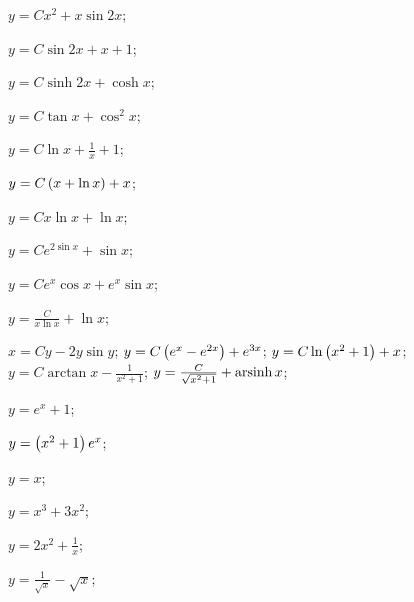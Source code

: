 \begin{enumsols}
		\item \( y = Cx^2 + x \sin{2x} \); \sfill %
		\item \( y = C \sin{2x} + x + 1 \); \sfill %
		\item \( y = C \sinh{2x} + \cosh{x} \); \sfill %
		\item \( y = C \tan{x} + \cos^2{x} \); \sfill %
		\item \( y = C \ln{x} + \frac{1}{x} + 1 \); \sfill %
		\item \( y = C \left( x + \ln{x} \right) + x \); \sfill %
		\item \( y = Cx \ln{x} + \ln{x} \); \sfill %
		\item \( y = Ce^{2 \sin{x}} + \sin{x} \); \sfill %
		\item \( y = Ce^{x} \cos{x} + e^{x} \sin{x} \); \sfill %
		\item \( y = \frac{C}{x \ln{x}} + \ln{x} \); \sfill %
		\item \( x = Cy - 2y \sin{y} \); \sfill %
		\itemstar \( y = C \left( e^{x} - e^{2x} \right) + e^{3x} \); \sfill %
		\itemstar \( y = C \ln\left( x^2 + 1 \right) + x \); \sfill %
		\itemstar \( y = C \arctan{x} - \frac{1}{x^2 + 1} \); \sfill %
		\itemstar \( y = \frac{C}{\sqrt{x^2 + 1}} + \operatorname{arsinh}{x} \); \sfill %

		\label{sol:firstorder:linear_cauchy}

		\item \( y = e^{x} + 1 \); \sfill %
		\item \( y = \left( x^2 + 1 \right) e^{x} \); \sfill %
		\item \( y = x \); \sfill %
		\item \( y = x^3 + 3x^2 \); \sfill %
		\item \( y = 2x^2 + \frac{1}{x} \); \sfill %
		\item \( y = \frac{1}{\sqrt{x}} - \sqrt{x} \); \sfill %


\end{enumsols}
